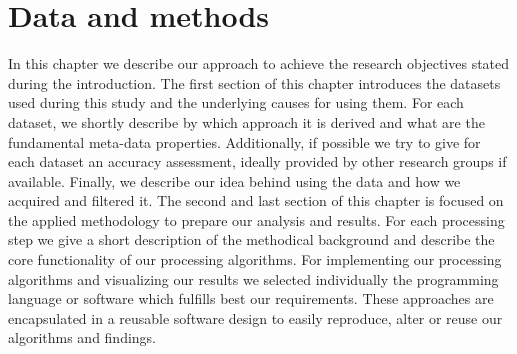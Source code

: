 \chapter{Data and methods}
\label{ch:data_methods}
	In this chapter we describe our approach to achieve the research objectives stated during the introduction. The first section of this chapter introduces the datasets used during this study and the underlying causes for using them. For each dataset, we shortly describe by which approach it is derived and what are the fundamental meta-data properties. Additionally, if possible we try to give for each dataset an accuracy assessment, ideally provided by other research groups if available. Finally, we describe our idea behind using the data and how we acquired and filtered it. The second and last section of this chapter is focused on the applied methodology to prepare our analysis and results. For each processing step we give a short description of the methodical background and describe the core functionality of our processing algorithms. For implementing our processing algorithms and visualizing our results we selected individually the programming language or software which fulfills best our requirements. These approaches are encapsulated in a reusable software design to easily reproduce, alter or reuse our algorithms and findings.

